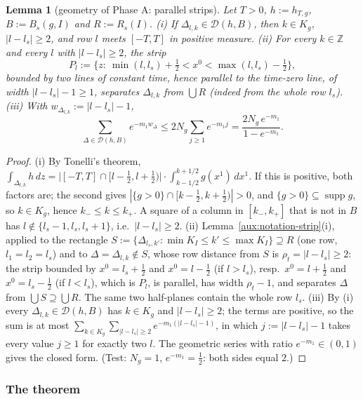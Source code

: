 \documentclass[11pt,a4paper]{article}
\theoremstyle{plain}
\theoremstyle{definition}
\theoremstyle{plain}
\newtheorem{auxlemma}{Lemma}
\theoremstyle{definition}
\newcommand{\Z}{\mathbb{Z}}
\DeclareMathOperator{\supp}{supp}
\begin{document}
\begin{auxlemma}[geometry of Phase A: parallel strips]\label{aux:d3-geom}
Let $T>0$, $h:=h_{T,g}$, $B:=B_s(g,I)$ and $R:=R_s(I)$.
\emph{(i)} If $\Delta_{l,k}\in\mathcal D(h,B)$, then $k\in K_g$, $|l-l_s|\ge2$, and row $l$ meets
$[-T,T]$ in positive measure.
\emph{(ii)} For every $k\in\Z$ and every $l$ with $|l-l_s|\ge2$, the strip
\[
 P_l:=\bigl\{z:\ \min(l,l_s)+\tfrac12<x^0<\max(l,l_s)-\tfrac12\bigr\},
\]
bounded by two lines of constant time, hence \emph{parallel to the time-zero line}, of width
$|l-l_s|-1\ge1$, separates $\Delta_{l,k}$ from $\bigcup R$ (indeed from the whole row $l_s$).
\emph{(iii)} With $w_{\Delta_{l,k}}:=|l-l_s|-1$,
\[
 \sum_{\Delta\in\mathcal D(h,B)}e^{-m_1w_\Delta}\le2N_g\sum_{j\ge1}e^{-m_1j}
 =\frac{2N_g\,e^{-m_1}}{1-e^{-m_1}} .
\]
\end{auxlemma}

\begin{proof}
(i) By Tonelli's theorem,
$\int_{\Delta_{l,k}}h\,dz=\bigl|[-T,T]\cap[l-\frac12,l+\frac12)\bigr|\cdot
\int_{k-1/2}^{k+1/2}g(x^1)\,dx^1$.  If this is positive, both factors are; the second gives
$|\{g>0\}\cap[k-\frac12,k+\frac12)|>0$, and $\{g>0\}\subseteq\supp g$, so $k\in K_g$, hence
$k_-\le k\le k_+$.  A square of a column in $[k_-,k_+]$ that is not in $B$ has
$l\notin\{l_s-1,l_s,l_s+1\}$, i.e.\ $|l-l_s|\ge2$.
(ii) Lemma~\ref{aux:notation-strip}(i), applied to the rectangle
$S:=\{\Delta_{l_s,k'}:\min K_I\le k'\le\max K_I\}\supseteq R$ (one row, $l_1=l_2=l_s$) and to
$\Delta=\Delta_{l,k}\notin S$, whose row distance from $S$ is $\rho_t=|l-l_s|\ge2$: the strip
bounded by $x^0=l_s+\frac12$ and $x^0=l-\frac12$ (if $l>l_s$), resp.\ $x^0=l+\frac12$ and
$x^0=l_s-\frac12$ (if $l<l_s$), which is $P_l$, is parallel, has width $\rho_t-1$, and separates
$\Delta$ from $\bigcup S\supseteq\bigcup R$.  The same two half-planes contain the whole row $l_s$.
(iii) By (i) every $\Delta_{l,k}\in\mathcal D(h,B)$ has $k\in K_g$ and $|l-l_s|\ge2$; the terms are
positive, so the sum is at most $\sum_{k\in K_g}\sum_{|l-l_s|\ge2}e^{-m_1(|l-l_s|-1)}$, in which
$j:=|l-l_s|-1$ takes every value $j\ge1$ for exactly two $l$.  The geometric series with ratio
$e^{-m_1}\in(0,1)$ gives the closed form.  (Test: $N_g=1$, $e^{-m_1}=\frac12$: both sides equal
$2$.)
\end{proof}

\subsubsection{The theorem}\label{sub:d3-thm}
\end{document}
